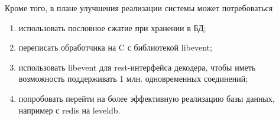 Кроме того, в плане улучшения реализации системы может потребоваться
{\renewcommand{\labelenumi}{\alph{enumi})}
	\begin{enumerate}
		\item использовать пословное сжатие при хранении в БД;
		\item переписать обработчика на C с библиотекой libevent;
		\item использовать libevent для rest-интерфейса декодера,
			чтобы иметь возможность поддерживать 1 млн. одновременных соединений;
		\item попробовать перейти на более эффективную реализацию базы данных, 
			например с redis на leveldb.
	\end{enumerate}
}

\pagebreak




